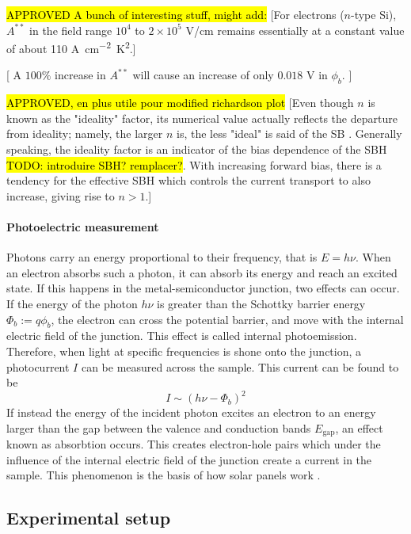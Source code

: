 \hl{APPROVED A bunch of interesting stuff, might add:}
[For electrons ($n$-type Si), $A^{**}$ in the field range $10^4$ to $2\times 10^5$ V/cm remains essentially at a constant value of about 110 \unit{A cm^{-2} K^2}.]

[ A $100 \%$ increase in $A^{**}$ will cause an increase of only $0.018$ V in $\phi_b$. ]


\hl{APPROVED, en plus utile pour modified richardson plot} [Even though $n$ is known as the  "ideality" factor, its numerical value actually reflects the departure from ideality; namely, the larger $n$ is, the less "ideal" is said of the SB \cite{tung_recent_2001}.
Generally speaking, the ideality factor is an indicator of the bias dependence of the SBH \hl{TODO: introduire SBH? remplacer?}. With increasing forward bias, there is a tendency for the effective SBH which controls the current transport to also increase, giving rise to $n > 1$.]


\paragraph{Photoelectric measurement}
Photons carry an energy proportional to their frequency, that is $E = h \nu$.
When an electron absorbs such a photon, it can absorb its energy and reach an excited state.
If this happens in the metal-semiconductor junction, two effects can occur.
If the energy of the photon $h\nu$ is greater than the Schottky barrier energy $\Phi_b := q\phi_b$, the electron can cross the potential barrier, and move with the internal electric field of the junction.
This effect is called internal photoemission.
Therefore, when light at specific frequencies is shone onto the junction, a photocurrent $I$ can be measured across the sample.
This current can be found to be \cite{notice}
\begin{equation}
    I \sim (h \nu - \Phi_b)^2
    \label{eq:fowler}
\end{equation}
If instead the energy of the incident photon excites an electron to an energy larger than the gap between the valence and conduction bands $E_\textrm{gap}$, an effect known as absorbtion occurs.
This creates electron-hole pairs which under the influence of the internal electric field of the junction create a current in the sample.
This phenomenon is the basis of how solar panels work \cite{notice}.

\subsection{Experimental setup}
